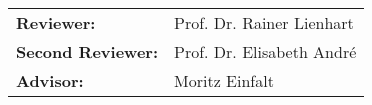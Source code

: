 {
	\vspace*{19.5cm}
	
	\Large{
	\def\arraystretch{1.2}
	\begin{tabular}{l l}
	
		\textbf{Reviewer:} & Prof. Dr. Rainer Lienhart\\
		\textbf{Second Reviewer:} & Prof. Dr. Elisabeth André\\
		\textbf{Advisor:} & Moritz Einfalt
	
	\end{tabular}
	}\par
	
	\def\arraystretch{1}
}
\restoregeometry
\pagebreak
